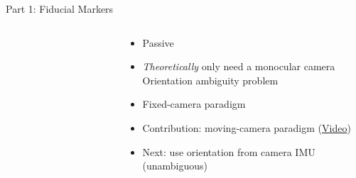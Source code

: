 \documentclass[aspectratio=169]{beamer}
\newif\ifpause
\newcommand{\mypause}{\ifpause \pause \fi}
\begin{document}
\begin{frame}{Part 1: Fiducial Markers}
\begin{columns}
\begin{column}{0.37\textwidth}
\begin{figure}[]
\begin{subfigure}[b]{0.45\linewidth}
			\label{figure:apriltag48h12}
		    \end{subfigure}
		    \label{figure:marker_setup}
		\end{figure}
        \end{column}
        \begin{column}{0.6\textwidth}
		\begin{itemize}
			\item Passive
			\item \emph{Theoretically} only need a monocular camera\mypause\\Orientation ambiguity problem
			\item Fixed-camera paradigm
			\item Contribution: moving-camera paradigm (\href{https://vimeo.com/664863992}{Video})
			\item Next: use orientation from camera IMU (unambiguous)
		\end{itemize}
        \end{column}
    \end{columns}
\end{frame}
\end{document}
